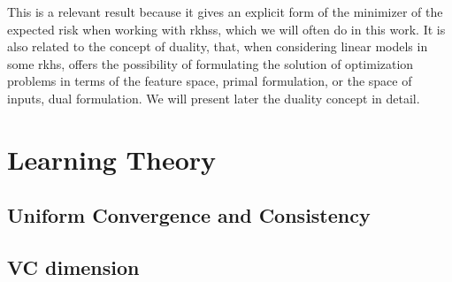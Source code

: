 This is a relevant result because it gives an explicit form of the minimizer of the expected risk when working with \acrshort{rkhss}, which we will often do in this work. It is also related to the concept of duality, that, when considering linear models in some \acrshort{rkhs}, offers the possibility of formulating the solution of optimization problems in terms of the feature space, primal formulation, or the space of inputs, dual formulation. We will present later the duality concept in detail. 



















\section{Learning Theory}
% 
%






\subsection{Uniform Convergence and Consistency}




\subsection{VC dimension}

